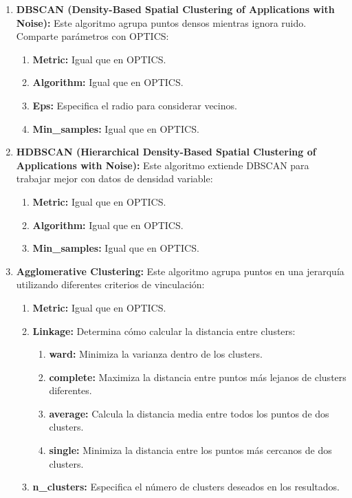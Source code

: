 \begin{enumerate}
    \item \textbf{DBSCAN (Density-Based Spatial Clustering of Applications with Noise):}
    Este algoritmo agrupa puntos densos mientras ignora ruido. Comparte parámetros con OPTICS:
    \begin{enumerate}
        \item \textbf{Metric:} Igual que en OPTICS.
        \item \textbf{Algorithm:} Igual que en OPTICS.
        \item \textbf{Eps:} Especifica el radio para considerar vecinos.
        \item \textbf{Min\_samples:} Igual que en OPTICS.
    \end{enumerate}
    
    \item \textbf{HDBSCAN (Hierarchical Density-Based Spatial Clustering of Applications with Noise):}
    Este algoritmo extiende DBSCAN para trabajar mejor con datos de densidad variable:
    \begin{enumerate}
        \item \textbf{Metric:} Igual que en OPTICS.
        \item \textbf{Algorithm:} Igual que en OPTICS.
        \item \textbf{Min\_samples:} Igual que en OPTICS.
    \end{enumerate}
    
    \item \textbf{Agglomerative Clustering:}
    Este algoritmo agrupa puntos en una jerarquía utilizando diferentes criterios de vinculación:
    \begin{enumerate}
        \item \textbf{Metric:} Igual que en OPTICS.
        \item \textbf{Linkage:} Determina cómo calcular la distancia entre clusters:
        \begin{enumerate}
            \item \textbf{ward:} Minimiza la varianza dentro de los clusters.
            \item \textbf{complete:} Maximiza la distancia entre puntos más lejanos de clusters diferentes.
            \item \textbf{average:} Calcula la distancia media entre todos los puntos de dos clusters.
            \item \textbf{single:} Minimiza la distancia entre los puntos más cercanos de dos clusters.
        \end{enumerate}
        \item \textbf{n\_clusters:} Especifica el número de clusters deseados en los resultados.
    \end{enumerate}
    

\end{enumerate}
